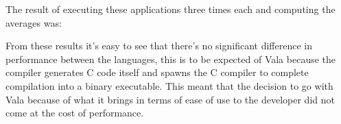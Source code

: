       The result of executing these applications three times each and computing
      the averages was:

      \begin{table}[H]
      \centering
      \end{table}

      From these results it's easy to see that there's no significant
      difference in performance between the languages, this is to be expected
      of Vala because the compiler generates C code itself and spawns the C
      compiler to complete compilation into a binary executable. This meant
      that the decision to go with Vala because of what it brings in terms of
      ease of use to the developer did not come at the cost of performance.

